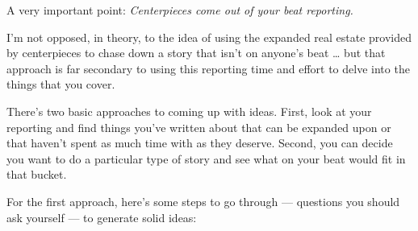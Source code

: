 \documentclass[
  11pt,
  american,
  letterpaperpaper,
  extrafontsizes,onecolumn,openright
  ]{memoir}
\begin{document}
A very important point: \emph{Centerpieces come out of your beat reporting.}

I'm not opposed, in theory, to the idea of using the expanded real estate provided by centerpieces to chase down a story that isn't on anyone's beat \ldots{} but that approach is far secondary to using this reporting time and effort to delve into the things that you cover.

There's two basic approaches to coming up with ideas. First, look at your reporting and find things you've written about that can be expanded upon or that haven't spent as much time with as they deserve. Second, you can decide you want to do a particular type of story and see what on your beat would fit in that bucket.

For the first approach, here's some steps to go through --- questions you should ask yourself --- to generate solid ideas:
\end{document}
